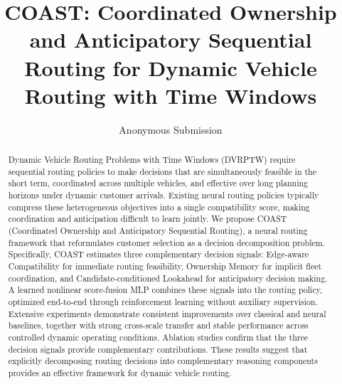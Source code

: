 \documentclass[letterpaper]{article}
\begin{document}
\title{COAST: Coordinated Ownership and Anticipatory Sequential Routing for Dynamic Vehicle Routing with Time Windows}
\author{Anonymous Submission}
\affiliations{}

	
\maketitle

\begin{abstract}
Dynamic Vehicle Routing Problems with Time Windows (DVRPTW) require sequential routing policies to make decisions that are simultaneously feasible in the short term, coordinated across multiple vehicles, and effective over long planning horizons under dynamic customer arrivals. Existing neural routing policies typically compress these heterogeneous objectives into a single compatibility score, making coordination and anticipation difficult to learn jointly. We propose COAST (Coordinated Ownership and Anticipatory Sequential Routing), a neural routing framework that reformulates customer selection as a decision decomposition problem. Specifically, COAST estimates three complementary decision signals: Edge-aware Compatibility for immediate routing feasibility, Ownership Memory for implicit fleet coordination, and Candidate-conditioned Lookahead for anticipatory decision making. A learned nonlinear score-fusion MLP combines these signals into the routing policy, optimized end-to-end through reinforcement learning without auxiliary supervision. Extensive experiments demonstrate consistent improvements over classical and neural baselines, together with strong cross-scale transfer and stable performance across controlled dynamic operating conditions. Ablation studies confirm that the three decision signals provide complementary contributions. These results suggest that explicitly decomposing routing decisions into complementary reasoning components provides an effective framework for dynamic vehicle routing.
\end{abstract}
\end{document}

